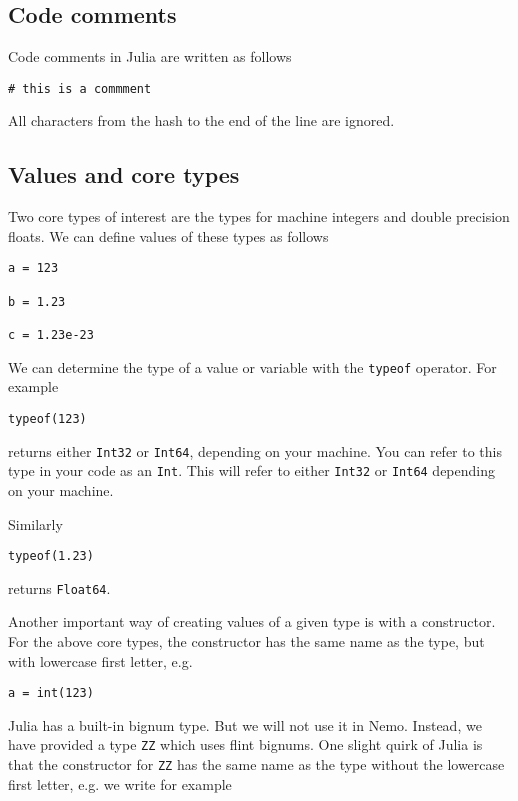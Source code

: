 \documentclass[a4paper,10pt]{article}
\newcommand{\code}{\lstinline}
\begin{document}
\subsection{Code comments}

Code comments in Julia are written as follows

\begin{lstlisting}
# this is a commment
\end{lstlisting}

All characters from the hash to the end of the line are ignored.

\subsection{Values and core types}

Two core types of interest are the types for machine integers and double precision floats. We can
define values of these types as follows

\begin{lstlisting}
a = 123

b = 1.23

c = 1.23e-23
\end{lstlisting}

We can determine the type of a value or variable with the \code{typeof} operator. For example

\begin{lstlisting}
typeof(123)
\end{lstlisting}

returns either \code{Int32} or \code{Int64}, depending on your machine. You can refer to this type in
your code as an \code{Int}. This will refer to either \code{Int32} or \code{Int64} depending on your
machine.

Similarly

\begin{lstlisting}
typeof(1.23)
\end{lstlisting}

returns \code{Float64}.

Another important way of creating values of a given type is with a constructor. For the above core
types, the constructor has the same name as the type, but with lowercase first letter, e.g.

\begin{lstlisting}
a = int(123)
\end{lstlisting}

Julia has a built-in bignum type. But we will not use it in Nemo. Instead, we have provided a type
\code{ZZ} which uses flint bignums. One slight quirk of Julia is that the constructor for \code{ZZ}
has the same name as the type without the lowercase first letter, e.g. we write for example
\end{document}
